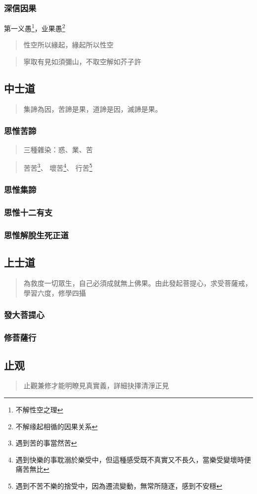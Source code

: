 \subsubsection{深信因果}
第一义愚\footnote{不解性空之理}，业果愚\footnote{不解缘起相循的因果关系}
\begin{quote}
  性空所以緣起，緣起所以性空
\end{quote}
\begin{quote}
  寧取有見如須彌山，不取空解如芥子許
\end{quote}




\subsection{中士道}
\begin{quote}
  集諦為因，苦諦是果，道諦是因，滅諦是果。
\end{quote}
\subsubsection{思惟苦諦}
\begin{quote}
  三種雜染：惑、業、苦
\end{quote}
\begin{quote}
  苦苦\footnote{遇到苦的事當然苦}、
  壞苦\footnote{遇到快樂的事耽溺於樂受中，但這種感受既不真實又不長久，當樂受變壞時便痛苦無比}、
  行苦\footnote{遇到不苦不樂的捨受中，因為遷流變動，無常所隨逐，感到不安穩}
\end{quote}
\subsubsection{思惟集諦}
\subsubsection{思惟十二有支}
\subsubsection{思惟解脫生死正道}



\subsection{上士道}
\begin{quote}
  為救度一切眾生，自己必須成就無上佛果。由此發起菩提心，求受菩薩戒，學習六度，修學四攝
\end{quote}
\subsubsection{發大菩提心}
\subsubsection{修菩薩行}


\subsection{止观}
\begin{quote}
  止觀兼修才能明瞭見真實義，詳細抉擇清淨正見
\end{quote}

